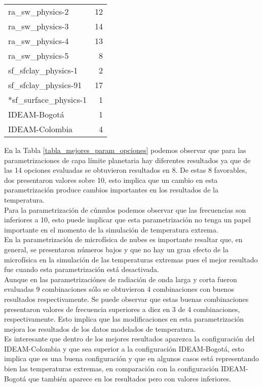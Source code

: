 \begin{itemize}
\begin{table}[H]
\begin{tabular}{lr}
ra\_sw\_physics-2      &     12 \\
ra\_sw\_physics-3      &     14 \\
ra\_sw\_physics-4      &     13 \\
ra\_sw\_physics-5      &      8 \\ \hline
sf\_sfclay\_physics-1  &      2 \\
sf\_sfclay\_physics-91 &     17 \\ \hline
*sf\_surface\_physics-1 &      1 \\
IDEAM-Bogotá         &      1 \\
IDEAM-Colombia       &      4 \\
\bottomrule
\end{tabular}
\end{table}

En la Tabla \ref{tabla_mejores_param_opciones} podemos observar que para las parametrizaciones de capa límite planetaria hay diferentes resultados ya que de las 14 opciones evaluadas se obtuvieron resultados en 8. De estas 8 favorables, dos presentaron valores sobre 10, esto implica que un cambio en esta parametrización produce cambios importantes en los resultados de la temperatura.\\ 

Para la parametrización de cúmulos podemos observar que las frecuencias son inferiores a 10, esto puede implicar que esta parametrización no tenga un papel importante en el momento de la simulación de temperatura extrema.\\

En la parametrización de microfísica de nubes es importante resaltar que, en general, se presentaron números bajos y que no hay un gran efecto de la microfísica en la simulación de las temperaturas extremas pues el mejor resultado fue cuando esta parametrización está desactivada.\\

Aunque en las parametrizaciónes de radiación de onda larga y corta fueron evaluadas 9 combinaciones sólo se obtuvieron 4 combinaciones con buenos resultados respectivamente. Se puede observar que estas buenas combinaciones presentaron valores de frecuencia superiores a diez en 3 de 4 combinaciones, respectivamente. Esto implica que las modificaciones en esta parametrización mejora los resultados de los datos modelados de temperatura.\\


Es interesante que dentro de los mejores resultados aparezca la configuración del IDEAM-Colombia y que sea superior a la configuración IDEAM-Bogotá, esto implica que es una buena configuración y que en algunos casos está representando bien las temperaturas extremas, en comparación con la configuración IDEAM-Bogotá que también aparece en los resultados pero con valores inferiores.\\


\end{itemize}
